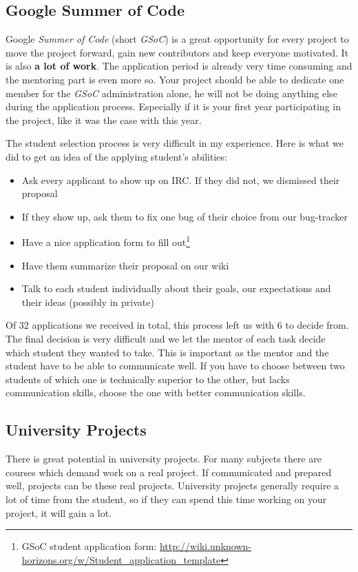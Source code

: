 \subsection{Google Summer of Code}
Google \textit{Summer of Code} (short \textit{GSoC}) is a great opportunity for every \OS{} project to move the project
forward, gain new contributors and keep everyone motivated. It is also \textbf{a lot of work}. The application period is
already very time consuming and the mentoring part is even more so. Your project should be able to dedicate one member
for the \textit{GSoC} administration alone, he will not be doing anything else during the application process. Especially
if it is your first year participating in the project, like it was the case with \UH{} this year.

\pagebreak{}

The student selection process is very difficult in my experience. Here is what we did to get an idea of the applying student's
abilities:
\begin{itemize}
    \item Ask every applicant to show up on IRC. If they did not, we dismissed their proposal
    \item If they show up, ask them to fix one bug of their choice from our bug-tracker
    \item Have a nice application form to fill out\footnote{\UH{} GSoC student application form:
        \url{http://wiki.unknown-horizons.org/w/Student_application_template}}
    \item Have them summarize their proposal on our wiki
    \item Talk to each student individually about their goals, our expectations and their ideas (possibly in private)
\end{itemize}

Of 32 applications we received in total, this process left us with 6 to decide from. The final decision is very difficult
and we let the mentor of each task decide which student they wanted to take. This is important as the mentor and the
student have to be able to
communicate well. If you have to choose between two students of which one is technically superior to the other, but
lacks communication skills, choose the one with better communication skills.

\subsection{University Projects}
There is great potential in university projects. For many subjects there are courses which demand work on a real
project. If communicated and prepared well, \OS{} projects can be these real projects. University projects generally
require a lot of time from the student, so if they can spend this time working on your project, it will gain a lot.

